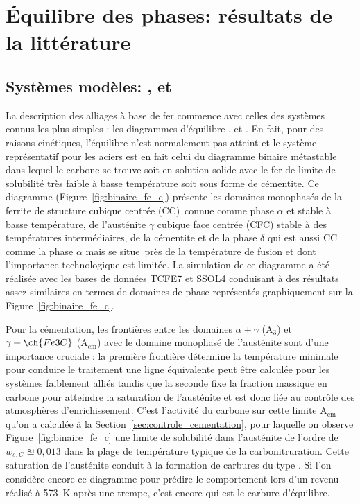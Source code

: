 \section{Équilibre des phases: résultats de la littérature}
\label{sec:low_alloy_literature}

\subsection{Systèmes modèles: ,  et }
\label{sec:simple_systems}

La description des alliages à base de fer commence avec celles des systèmes connus les plus simples : les diagrammes d'équilibre ,  et . En fait, pour des raisons cinétiques, l'équilibre  n'est normalement pas atteint et le système représentatif pour les aciers est en fait celui du diagramme binaire métastable ~\cite{Mittemeijer2010} dans lequel le carbone se trouve soit en solution solide avec le fer \textendash{} de limite de solubilité très faible à basse température \textendash{} soit sous forme de cémentite. Ce diagramme (Figure~\ref{fig:binaire_fe_c}) présente les domaines monophasés de la ferrite de structure cubique centrée (CC) connue comme phase $\alpha$ et stable à basse température, de l'austénite $\gamma$ cubique face centrée (CFC) stable à des températures intermédiaires, de la cémentite  et de la phase $\delta$ qui est aussi \og{}CC\fg{} comme la phase $\alpha$ mais se situe près de la température de fusion et dont l'importance technologique est limitée. La simulation de ce diagramme a été réalisée avec les bases de données TCFE7 et SSOL4 conduisant à des résultats assez similaires en termes de domaines de phase représentés graphiquement sur la Figure~\ref{fig:binaire_fe_c}.

Pour la cémentation, les frontières entre les domaines $\alpha+\gamma$ ($\mathrm{A_{3}}$) et $\gamma+\ch{Fe3C}$ ($\mathrm{A_{cm}}$) avec le domaine monophasé de l'austénite sont d'une importance cruciale : la première frontière détermine la température minimale pour conduire le traitement \textendash{} une ligne équivalente peut être calculée pour les systèmes faiblement alliés \textendash{} tandis que la seconde fixe la fraction massique en carbone pour atteindre la saturation de l'austénite et est donc liée au contrôle des atmosphères d'enrichissement. C'est l'activité du carbone sur cette limite $\mathrm{A_{cm}}$ qu'on a calculée à la Section~\ref{sec:controle_cementation}, pour laquelle on observe Figure~\ref{fig:binaire_fe_c} une limite de solubilité dans l'austénite de l'ordre de $w_{s,C}\approxeq0,013$ dans la plage de température typique de la carbonitruration. Cette saturation de l'austénite conduit à la formation de carbures du type . Si l'on considère encore ce diagramme pour prédire le comportement lors d'un revenu réalisé à \SI{573}{\kelvin} après une trempe, c'est encore  qui est le carbure d'équilibre.


